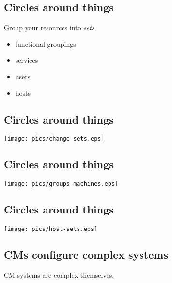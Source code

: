 \documentclass[xga]{xdvislides}
\begin{document}
\subsection{Circles around things}
Group your resources into {\em sets}. \\
\vspace{.5in}

\begin{itemize}
	\item functional groupings
	\item services
	\item users
	\item hosts
\end{itemize}

\subsection{Circles around things}
\vspace*{\fill}
\begin{center}
	\texttt{[image: pics/change-sets.eps]} \\
\end{center}
\vspace*{\fill}

\subsection{Circles around things}
\vspace*{\fill}
\begin{center}
	\texttt{[image: pics/groups-machines.eps]} \\
\end{center}
\vspace*{\fill}

\subsection{Circles around things}
\vspace*{\fill}
\begin{center}
	\texttt{[image: pics/host-sets.eps]} \\
\end{center}
\vspace*{\fill}

\subsection{CMs configure complex systems}
CM systems are complex themselves. \\
\vspace{.25in}
\end{document}
